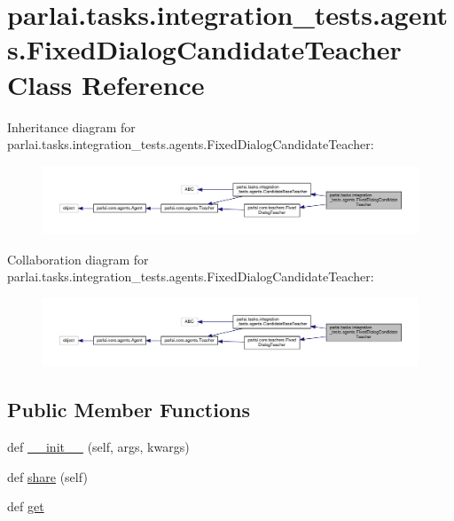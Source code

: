 \hypertarget{classparlai_1_1tasks_1_1integration__tests_1_1agents_1_1FixedDialogCandidateTeacher}{}\section{parlai.\+tasks.\+integration\+\_\+tests.\+agents.\+Fixed\+Dialog\+Candidate\+Teacher Class Reference}
\label{classparlai_1_1tasks_1_1integration__tests_1_1agents_1_1FixedDialogCandidateTeacher}


Inheritance diagram for parlai.\+tasks.\+integration\+\_\+tests.\+agents.\+Fixed\+Dialog\+Candidate\+Teacher\+:
\nopagebreak
\begin{figure}[H]
\begin{center}
\leavevmode
\includegraphics[width=350pt]{dc/dc3/classparlai_1_1tasks_1_1integration__tests_1_1agents_1_1FixedDialogCandidateTeacher__inherit__graph}
\end{center}
\end{figure}


Collaboration diagram for parlai.\+tasks.\+integration\+\_\+tests.\+agents.\+Fixed\+Dialog\+Candidate\+Teacher\+:
\nopagebreak
\begin{figure}[H]
\begin{center}
\leavevmode
\includegraphics[width=350pt]{da/dab/classparlai_1_1tasks_1_1integration__tests_1_1agents_1_1FixedDialogCandidateTeacher__coll__graph}
\end{center}
\end{figure}
\subsection*{Public Member Functions}
\begin{DoxyCompactItemize}
\item 
def \hyperlink{classparlai_1_1tasks_1_1integration__tests_1_1agents_1_1FixedDialogCandidateTeacher_a021aef445504c6ff646501dc665e1362}{\+\_\+\+\_\+init\+\_\+\+\_\+} (self, args, kwargs)
\item 
def \hyperlink{classparlai_1_1tasks_1_1integration__tests_1_1agents_1_1FixedDialogCandidateTeacher_a50302ba3c9ee62f283d90e508a591971}{share} (self)
\item 
def \hyperlink{classparlai_1_1tasks_1_1integration__tests_1_1agents_1_1FixedDialogCandidateTeacher_a933e942087017cb09e64ca1a8b6323b0}{get}
\end{DoxyCompactItemize}

